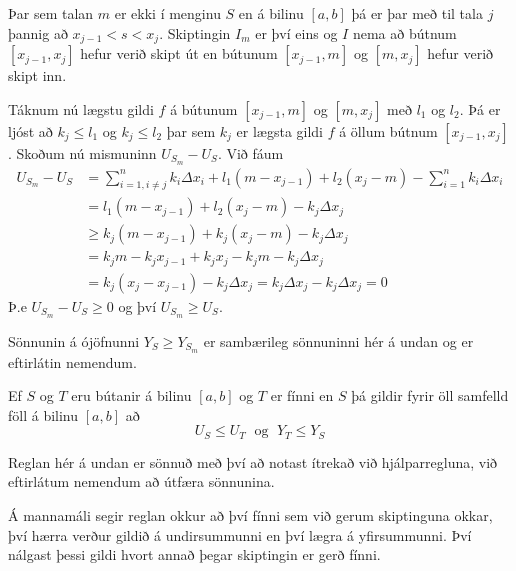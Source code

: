 \begin{sonnun}
Þar sem talan $m$ er ekki í menginu $S$ en á bilinu $[a,b]$ þá er þar með til tala $j$ þannig að $x_{j-1} < s < x_{j}$. Skiptingin $I_{m}$ er því eins og $I$ nema að bútnum $[x_{j-1},x_{j}]$ hefur verið skipt út en bútunum $[x_{j-1},m]$ og $[m,x_{j}]$ hefur verið skipt inn. 

\vspace{2mm}

Táknum nú lægstu gildi $f$ á bútunum $[x_{j-1},m]$ og $[m,x_{j}]$ með $l_{1}$ og $l_{2}$. Þá er ljóst að $k_{j} \leq l_{1}$ og $k_{j} \leq l_{2}$ þar sem $k_{j}$ er lægsta gildi $f$ á öllum bútnum $[x_{j-1},x_{j}]$. Skoðum nú mismuninn $U_{S_{m}} - U_{S}$. Við fáum
\begin{align*}
U_{S_{m}} - U_{S} &= \sum_{i= 1, i \neq j}^{n} k_{i}\Delta x_{i} + l_{1}\left(m-x_{j-1}\right)+l_{2}\left(x_{j} - m\right) - \sum_{i = 1}^{n} k_{i}\Delta x_{i}\\ &= l_{1}\left(m-x_{j-1}\right)+l_{2}\left(x_{j} - m\right) - k_{j}\Delta x_{j}\\ &\geq k_{j}\left(m-x_{j-1}\right)+k_{j}\left(x_{j} - m\right) - k_{j}\Delta x_{j}\\ &= k_{j}m-k_{j}x_{j-1}+k_{j}x_{j}-k_{j}m-k_{j}\Delta x_{j}\\ &= k_{j}(x_{j}-x_{j-1})-k_{j}\Delta x_{j} = k_{j}\Delta x_{j} - k_{j}\Delta x_{j} = 0
\end{align*}
Þ.e $U_{S_{m}} - U_{S} \geq 0$ og því $U_{S_{m}} \geq U_{S}$.

\vspace{2mm}

Sönnunin á ójöfnunni $Y_{S} \geq Y_{S_{m}}$ er sambærileg sönnuninni hér á undan og er eftirlátin nemendum.

\end{sonnun}

\begin{regla}{}
Ef $S$ og $T$ eru bútanir á bilinu $[a,b]$ og $T$ er fínni en $S$ þá gildir fyrir öll samfelld föll á bilinu $[a,b]$ að 
$$
U_{S} \leq U_{T} \; \text{ og } \; Y_{T} \leq Y_{S}
$$
\end{regla}

\begin{ath}
Reglan hér á undan er sönnuð með því að notast ítrekað við hjálparregluna, við eftirlátum nemendum að útfæra sönnunina.
\end{ath}

\begin{ath}
Á mannamáli segir reglan okkur að því fínni sem við gerum skiptinguna okkar, því hærra verður gildið á undirsummunni en því lægra á yfirsummunni. Því nálgast þessi gildi hvort annað þegar skiptingin er gerð fínni.
\end{ath}

